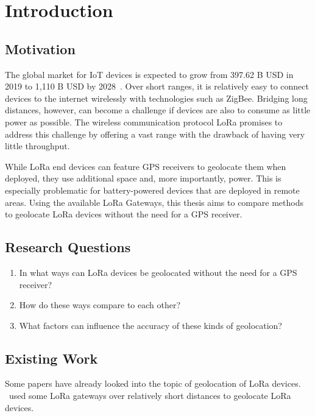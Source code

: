 \chapter{Introduction}

\section{Motivation}

The global market for IoT devices is expected to grow from 397.62 B USD in 2019 to 1,110 B USD by 2028~\cite{grand_view_research_global_2022}.
Over short ranges, it is relatively easy to connect devices to the internet wirelessly with technologies such as ZigBee.
Bridging long distances, however, can become a challenge if devices are also to consume as little power as possible.
The wireless communication protocol \ac{LoRa} promises to address this challenge by offering a vast range with the drawback of having very little throughput.

While \ac{LoRa} end devices can feature \ac{GPS} receivers to geolocate them when deployed, they use additional space and, more importantly, power.
This is especially problematic for battery-powered devices that are deployed in remote areas.
Using the available \ac{LoRa} Gateways, this thesis aims to compare methods to geolocate \ac{LoRa} devices without the need for a GPS receiver.

\section{Research Questions}

\begin{enumerate}
    \item In what ways can \ac{LoRa} devices be geolocated without the need for a GPS receiver?
    \item How do these ways compare to each other?
    \item What factors can influence the accuracy of these kinds of geolocation?
\end{enumerate}

\section{Existing Work}

Some papers have already looked into the topic of geolocation of \ac{LoRa} devices.
\cite{mackey_lora-based_2019}~used some \ac{LoRa} gateways over relatively short distances to geolocate \ac{LoRa} devices.

